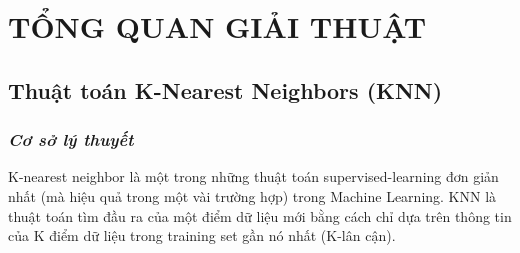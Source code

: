 \documentclass{report}
\begin{document}
\fontsize{16}{10}\selectfont
\chapter{TỔNG QUAN GIẢI THUẬT}
\fontsize{14}{10}\selectfont
\section{Thuật toán K-Nearest Neighbors (KNN)}
\subsection{\textit{Cơ sở lý thuyết}}
    \fontsize{13}{14}\selectfont
    K-nearest neighbor là một trong những thuật toán supervised-learning đơn giản nhất (mà hiệu quả trong một vài trường hợp) trong Machine Learning. KNN là thuật toán tìm đầu ra của một điểm dữ liệu mới bằng cách chỉ dựa trên thông tin của K điểm dữ liệu trong training set gần nó nhất (K-lân cận).
\end{document}
